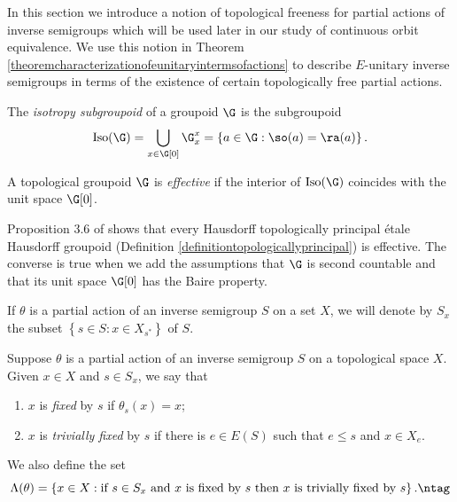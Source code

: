 In this section we introduce a notion of topological freeness for partial actions of inverse semigroups which will be used later in our study of continuous orbit equivalence. We use this notion in Theorem \ref{theoremcharacterizationofeunitaryintermsofactions} to describe $E$-unitary inverse semigroups in terms of the existence of certain topologically free partial actions.

\begin{definition}
The \emph{isotropy subgroupoid} of a groupoid $\G$ is the subgroupoid
\[\operatorname{Iso}(\G)=\bigcup_{x\in\G[0]}\G_x^x=\left\{a\in\G:\so(a)=\ra(a)\right\}.\]
\end{definition}

\begin{definition}[{\cite{MR2460017}}]\label{definitioneffective}
A topological groupoid $\G$ is \emph{effective} if the interior of $\operatorname{Iso}(\G)$ coincides with the unit space $\G[0]$.
\end{definition}

Proposition 3.6 of \cite{MR2460017} shows that every Hausdorff topologically principal étale Hausdorff groupoid (Definition \ref{definitiontopologicallyprincipal}) is effective. The converse is true when we add the assumptions that $\G$ is second countable and that its unit space $\G[0]$ has the Baire property.

If $\theta$ is a partial action of an inverse semigroup $S$ on a set $X$, we will denote by $S_x$ the subset $\left\{s\in S:x\in X_{s^*}\right\}$ of $S$.

\begin{definition}[{\cite[Definition 4.1]{MR3448414}}]
Suppose $\theta$ is a partial action of an inverse semigroup $S$ on a topological space $X$. Given $x\in X$ and $s\in S_x$, we say that
\begin{enumerate}
\item $x$ is \emph{fixed} by $s$ if $\theta_s(x)=x$;
\item $x$ is \emph{trivially fixed} by $s$ if there is $e\in E(S)$ such that $e\leq s$ and $x\in X_e$.
\end{enumerate}
We also define the set
\[\Lambda(\theta)=\left\{x\in X:\text{if }s\in S_x\text{ and }x\text{ is fixed by }s\text{ then }x\text{ is trivially fixed by }s\right\}.
\ntag\label{equationdefinitionlambda}\]%
\end{definition}

